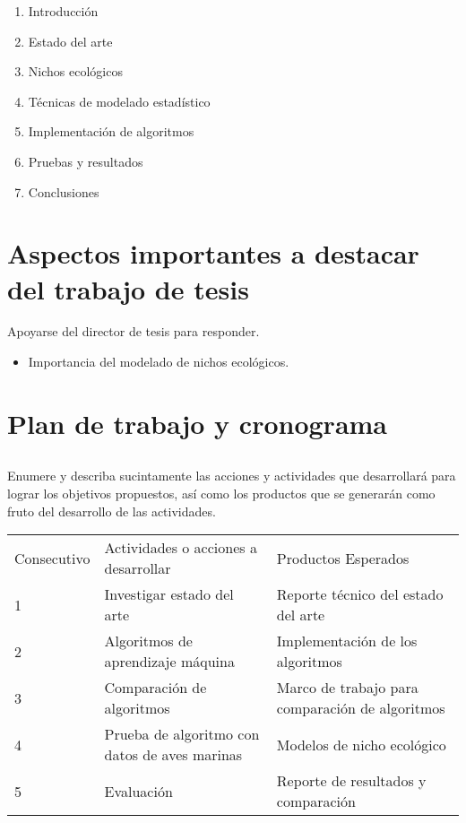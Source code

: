 \documentclass[runningheads,a4paper]{llncs}
\begin{document}
\begin{enumerate}
    \item Introducción
    \item Estado del arte
    \item Nichos ecológicos
    \item Técnicas de modelado estadístico
    \item Implementación de algoritmos
    \item Pruebas y resultados
    \item Conclusiones
\end{enumerate}

\section{Aspectos importantes a destacar del trabajo de tesis}
Apoyarse del director de tesis para responder.
\begin{itemize}
    \item Importancia del modelado de nichos ecológicos.
\end{itemize}


\section{Plan de trabajo y cronograma}
\subsection{ }
Enumere y describa sucintamente las acciones y actividades que desarrollará para
lograr los objetivos propuestos, así como los productos que se generarán como
fruto del desarrollo de las actividades. 
\begin{table}
\begin{center}
 \begin{tabular}{|p{2cm}|p{6cm}|p{6cm}|}
\hline\noalign{\smallskip} Consecutivo & Actividades o acciones a desarrollar &
Productos Esperados\\
\noalign{\smallskip}
\hline
\noalign{\smallskip}
1& Investigar estado del arte & Reporte técnico del estado del arte \\\hline
2& Algoritmos de aprendizaje máquina & Implementación de los algoritmos \\\hline
3& Comparación de algoritmos & Marco de trabajo para comparación de algoritmos \\\hline
4& Prueba de algoritmo con datos de aves marinas & Modelos de nicho ecológico \\\hline
5& Evaluación & Reporte de resultados y comparación \\\hline
\end{tabular}
\end{center}
\end{table}
\end{document}

